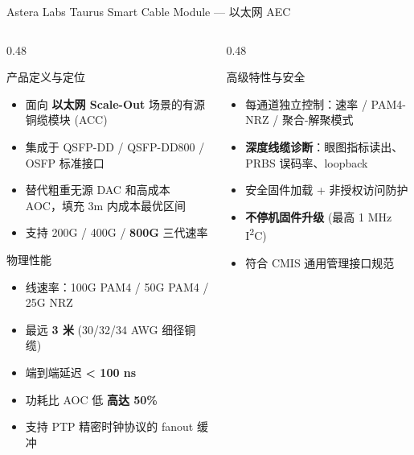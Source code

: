 \documentclass[aspectratio=169, 10pt, UTF8]{ctexbeamer}
\begin{document}
\begin{frame}{Astera Labs Taurus Smart Cable Module — 以太网 AEC}
  \centering
  \scriptsize
  \vspace{-10pt}
  \begin{columns}[T]
    \begin{column}{0.48\textwidth}
      \begin{block}{产品定义与定位}
        \begin{itemize}
          \item 面向 \textbf{以太网 Scale-Out} 场景的有源铜缆模块 (ACC)
          \item 集成于 QSFP-DD / QSFP-DD800 / OSFP 标准接口
          \item 替代粗重无源 DAC 和高成本 AOC，填充 3m 内成本最优区间
          \item 支持 200G / 400G / \textbf{800G} 三代速率
        \end{itemize}
      \end{block}
      \vspace{-10pt}
      \begin{alertblock}{物理性能}
        \begin{itemize}
          \item 线速率：100G PAM4 / 50G PAM4 / 25G NRZ
          \item 最远 \textbf{3 米} (30/32/34 AWG 细径铜缆)
          \item 端到端延迟 \textbf{< 100 ns}
          \item 功耗比 AOC 低 \textbf{高达 50\%}
          \item 支持 PTP 精密时钟协议的 fanout 缓冲
        \end{itemize}
      \end{alertblock}
    \end{column}
    \begin{column}{0.48\textwidth}
      \begin{exampleblock}{高级特性与安全}
        \begin{itemize}
          \item 每通道独立控制：速率 / PAM4-NRZ / 聚合-解聚模式
          \item \textbf{深度线缆诊断}：眼图指标读出、PRBS 误码率、loopback
          \item 安全固件加载 + 非授权访问防护
          \item \textbf{不停机固件升级} (最高 1 MHz I\textsuperscript{2}C)
          \item 符合 CMIS 通用管理接口规范
        \end{itemize}
      \end{exampleblock}


\end{column}
\end{columns}
\end{frame}
\end{document}
